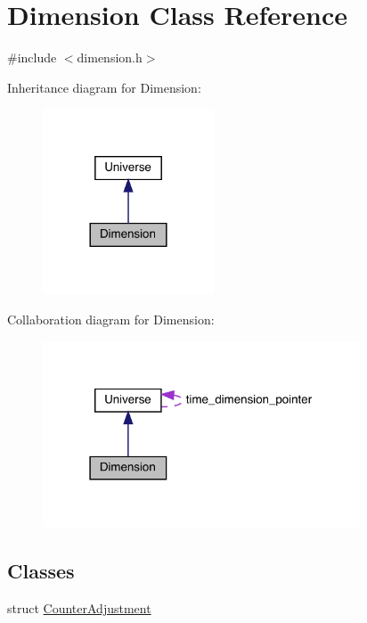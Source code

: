 \hypertarget{class_dimension}{}\section{Dimension Class Reference}
\label{class_dimension}


{\ttfamily \#include $<$dimension.\+h$>$}



Inheritance diagram for Dimension\+:\nopagebreak
\begin{figure}[H]
\begin{center}
\leavevmode
\includegraphics[width=144pt]{class_dimension__inherit__graph}
\end{center}
\end{figure}


Collaboration diagram for Dimension\+:\nopagebreak
\begin{figure}[H]
\begin{center}
\leavevmode
\includegraphics[width=267pt]{class_dimension__coll__graph}
\end{center}
\end{figure}
\subsection*{Classes}
\begin{DoxyCompactItemize}
\item 
struct \mbox{\hyperlink{struct_dimension_1_1_counter_adjustment}{Counter\+Adjustment}}
\end{DoxyCompactItemize}
